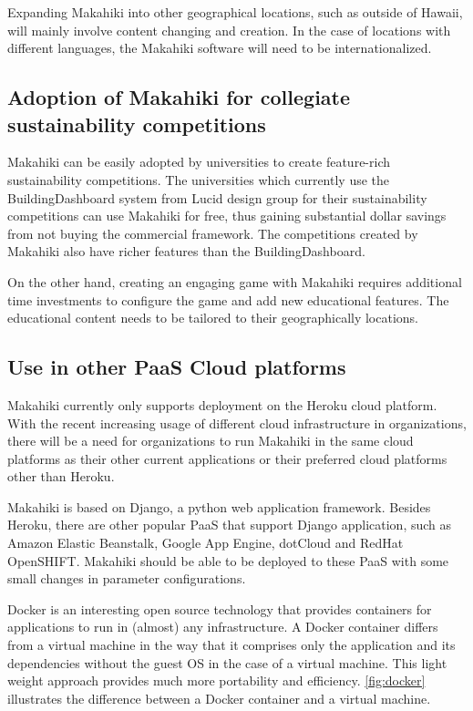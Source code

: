 Expanding Makahiki into other geographical locations, such as outside of Hawaii, will mainly involve content changing and creation. In the case of locations with different languages, the Makahiki software will need to be internationalized. 

\subsection{Adoption of Makahiki for collegiate sustainability competitions}

Makahiki can be easily adopted by universities to create feature-rich sustainability competitions. The universities which currently use the BuildingDashboard system from Lucid design group for their sustainability competitions can use Makahiki for free, thus gaining substantial dollar savings from not buying the commercial framework. The competitions created by Makahiki also have richer features than the BuildingDashboard. 

On the other hand, creating an engaging game with Makahiki requires additional time investments to configure the game and add new educational features. The educational content needs to be tailored to their geographically locations.

\subsection{Use in other PaaS Cloud platforms}
Makahiki currently only supports deployment on the Heroku cloud platform. With the recent increasing usage of different cloud infrastructure in organizations, there will be a need for organizations to run Makahiki in the same cloud platforms as their other current  applications or their preferred cloud platforms other than Heroku. 

Makahiki is based on Django, a python web application framework. Besides Heroku, there are other popular PaaS that support Django application, such as Amazon Elastic Beanstalk, Google App Engine, dotCloud and RedHat OpenSHIFT. Makahiki should be able to be deployed to these PaaS with some small changes in parameter configurations. 

Docker \cite{docker} is an interesting open source technology that provides containers for applications to run in (almost) any infrastructure. A Docker container differs from a virtual machine in the way that it comprises only the application and its dependencies without the guest OS in the case of a virtual machine. This light weight approach provides much more portability and efficiency. \autoref{fig:docker} illustrates the difference between a Docker container and a virtual machine.

